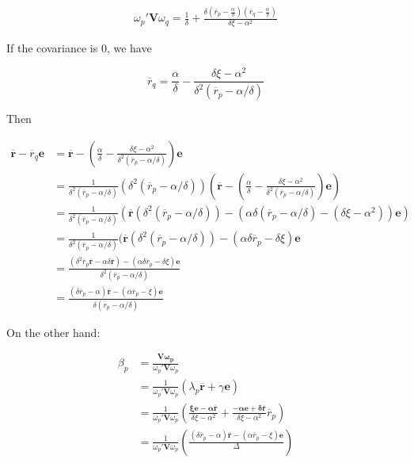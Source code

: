 \documentclass{article}
\begin{document}
\[ \begin{aligned}
  \omega_p'\mathbf{V}\omega_q=\frac{1}{\delta}+\frac{\delta(\overline{r}_p-\frac{\alpha}{\delta})(\overline{r}_q-\frac{\alpha}{\delta})}{\delta\xi-\alpha^2}
\end{aligned} \]

If the covariance is \(0\), we have

\[ \overline{r}_q=\frac{\alpha}{\delta}-\frac{\delta\xi-\alpha^2}{\delta^2(\overline{r}_p-\alpha/\delta)} \]

Then

\[ \begin{aligned}
  \mathbf{\overline{r}}-\overline{r}_q \mathbf{e}&=\mathbf{\overline{r}}-(\frac{\alpha}{\delta}-\frac{\delta\xi-\alpha^2}{\delta^2(\overline{r}_p-\alpha/\delta)})\mathbf{e}
  \\&=\frac{1}{\delta^2(\overline{r}_p-\alpha/\delta)}(\delta^2(\overline{r}_p-\alpha/\delta))(\mathbf{\overline{r}}-(\frac{\alpha}{\delta}-\frac{\delta\xi-\alpha^2}{\delta^2(\overline{r}_p-\alpha/\delta)})\mathbf{e})
  \\&=\frac{1}{\delta^2(\overline{r}_p-\alpha/\delta)}(\mathbf{\overline{r}}(\delta^2(\overline{r}_p-\alpha/\delta))-(\alpha\delta(\overline{r}_p-\alpha/\delta)-(\delta\xi-\alpha^2))\mathbf{e})
  \\&=\frac{1}{\delta^2(\overline{r}_p-\alpha/\delta)}(\mathbf{\overline{r}}(\delta^2(\overline{r}_p-\alpha/\delta))-(\alpha\delta\overline{r}_p-\delta\xi)\mathbf{e}
  \\&=\frac{
    (\delta^2\overline{r}_p\mathbf{\overline{r}}-\alpha\delta\mathbf{\overline{r}})-(\alpha\delta\overline{r}_p-\delta\xi)\mathbf{e}}
  {\delta^2(\overline{r}_p-\alpha/\delta)}
  \\&=\frac{
    (\delta\overline{r}_p-\alpha)\mathbf{\overline{r}}-(\alpha\overline{r}_p-\xi)\mathbf{e}}
  {\delta(\overline{r}_p-\alpha/\delta)}
\end{aligned} \]

On the other hand:

\[ \begin{aligned}
  \beta_p&=\frac{\mathbf{V\omega_p}}{\omega_p'\mathbf{V}\omega_p}
  \\&=\frac{1}{\omega_p'\mathbf{V}\omega_p}(\lambda_p\overline{\mathbf{r}}+\gamma \mathbf{e})
  \\&=\frac{1}{\omega_p'\mathbf{V}\omega_p}(\frac{\mathbf{\xi e-\alpha  \overline{r}}}{\delta\xi-\alpha^2}+\frac{\mathbf{-\alpha e+\delta\overline{r}}}{\delta\xi-\alpha^2}\overline{r}_p)
  \\&=\frac{1}{\omega_p'\mathbf{V}\omega_p}(\frac{ (\delta\overline{r}_p-\alpha)\mathbf{\overline{r}}-(\alpha\overline{r}_p-\xi)\mathbf{e}}{\Delta})
\end{aligned} \]
\end{document}
